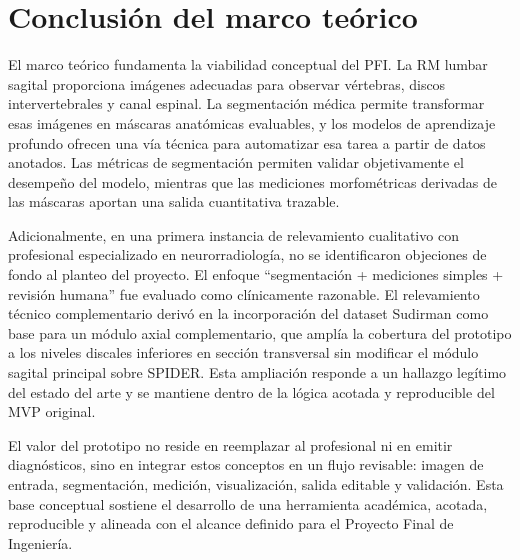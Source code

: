 \section{Conclusión del marco teórico}

El marco teórico fundamenta la viabilidad conceptual del PFI. La RM lumbar sagital proporciona imágenes adecuadas para observar vértebras, discos intervertebrales y canal espinal. La segmentación médica permite transformar esas imágenes en máscaras anatómicas evaluables, y los modelos de aprendizaje profundo ofrecen una vía técnica para automatizar esa tarea a partir de datos anotados. Las métricas de segmentación permiten validar objetivamente el desempeño del modelo, mientras que las mediciones morfométricas derivadas de las máscaras aportan una salida cuantitativa trazable.

Adicionalmente, en una primera instancia de relevamiento cualitativo con profesional especializado en neurorradiología, no se identificaron objeciones de fondo al planteo del proyecto. El enfoque ``segmentación + mediciones simples + revisión humana'' fue evaluado como clínicamente razonable. El relevamiento técnico complementario derivó en la incorporación del dataset Sudirman como base para un módulo axial complementario, que amplía la cobertura del prototipo a los niveles discales inferiores en sección transversal sin modificar el módulo sagital principal sobre SPIDER. Esta ampliación responde a un hallazgo legítimo del estado del arte y se mantiene dentro de la lógica acotada y reproducible del MVP original.

El valor del prototipo no reside en reemplazar al profesional ni en emitir diagnósticos, sino en integrar estos conceptos en un flujo revisable: imagen de entrada, segmentación, medición, visualización, salida editable y validación. Esta base conceptual sostiene el desarrollo de una herramienta académica, acotada, reproducible y alineada con el alcance definido para el Proyecto Final de Ingeniería.
